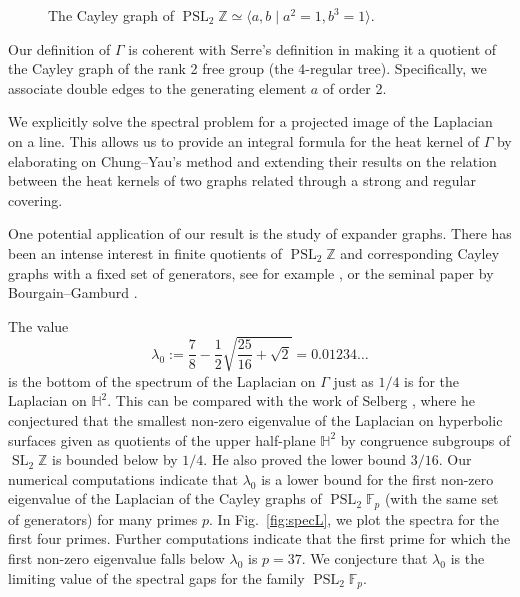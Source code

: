 \documentclass[11pt]{amsart}
\newcommand{\Z}{\mathbb{Z}}
\theoremstyle{definition}
\theoremstyle{remark}
\theoremstyle{plain}
\numberwithin{equation}{section}
\numberwithin{lemma}{section}
\numberwithin{definition}{section}
\numberwithin{proposition}{section}
\numberwithin{corollary}{section}
\numberwithin{theorem}{section}
\numberwithin{remark}{section}
\begin{document}
\begin{figure}[h]
\caption{The Cayley graph of $\operatorname{PSL}_2\Z \simeq \langle a,b\mid a^2=1,  b^3=1\rangle$.} \label{fig:cayley}
\end{figure}
Our definition of $\Gamma$ is coherent with Serre's definition in \cite{MR1954121} making it a quotient of the Cayley graph of the rank 2 free group (the $4$-regular tree). Specifically, we associate double edges to the generating element $a$ of order 2. 

We explicitly solve the spectral problem for a projected image of the Laplacian on a line.
This allows us to provide an integral formula for the heat kernel of $\Gamma$ by elaborating on Chung–Yau’s method and extending their results on the relation between the heat kernels of two graphs related through a strong and regular covering.

One potential application of our result is the study of expander graphs. There has been an intense interest in finite quotients of $\operatorname{PSL}_2\Z$ and corresponding Cayley graphs with a fixed set of generators, see for example \cite{MR2569682, MR3144176, MR3348442}, or the seminal paper by Bourgain--Gamburd \cite{MR2415383}. 

The value
$$
\lambda_0:=\frac78-\frac12\sqrt{\frac{25}{16}+\sqrt{2}}=0.01234\dots
$$
is the bottom of the spectrum of the Laplacian on $\Gamma$ just as $1/4$ is for the Laplacian on $\mathbb{H}^2$. This can be compared with the work of Selberg \cite{MR182610}, where he conjectured that the smallest non-zero eigenvalue of the Laplacian on hyperbolic surfaces given as quotients of the upper half-plane $\mathbb{H}^2$ by congruence subgroups of $\operatorname{SL}_2\Z$ is bounded below by $1/4$. 
He also proved the lower bound $3/16$. Our numerical computations indicate that $\lambda_0$ is a lower bound for the first non-zero eigenvalue of the Laplacian of the Cayley graphs of $\operatorname{PSL}_2\mathbb{F}_p$ (with the same set of generators) for many primes $p$. In Fig.~\ref{fig:specL}, we plot the spectra for the first four primes. Further computations indicate that the first prime for which the first non-zero eigenvalue falls below $\lambda_0$ is $p=37$. 
We conjecture that $\lambda_0$ is the limiting value of the spectral gaps for the family $\operatorname{PSL}_2\mathbb{F}_p$.
\end{document}
